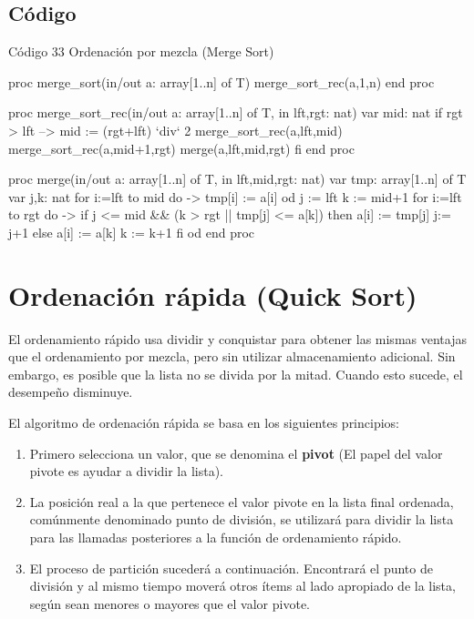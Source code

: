 \subsection{Código}

\begin{codebox}{Código 33}
\footnotesize Ordenación por mezcla (Merge Sort)
\tcblower
\begin{pascallike}
proc merge_sort(in/out a: array[1..n] of T)
    merge_sort_rec(a,1,n)
end proc

proc merge_sort_rec(in/out a: array[1..n] of T, in lft,rgt: nat)
    var mid: nat
    if rgt > lft --> mid := (rgt+lft) `div` 2
        merge_sort_rec(a,lft,mid)
        merge_sort_rec(a,mid+1,rgt)
        merge(a,lft,mid,rgt)
    fi
end proc

proc merge(in/out a: array[1..n] of T, in lft,mid,rgt: nat)
    var tmp: array[1..n] of T
    var j,k: nat
    for i:=lft to mid do ->
        tmp[i] := a[i] 
    od
    j := lft
    k := mid+1
    for i:=lft to rgt do ->
        if j <= mid && (k > rgt || tmp[j] <= a[k])
            then a[i] := tmp[j]
                j:= j+1
            else a[i] := a[k]
                k := k+1
        fi
    od
end proc
\end{pascallike}
\end{codebox}

\section{Ordenación rápida (Quick Sort)}
El ordenamiento rápido usa dividir y conquistar para obtener las mismas ventajas que el ordenamiento por mezcla, pero sin utilizar almacenamiento adicional. Sin embargo, es posible que la lista no se divida por la mitad. Cuando esto sucede, el desempeño disminuye.

El algoritmo de ordenación rápida se basa en los siguientes principios:
\begin{enumerate}
    \item Primero selecciona un valor, que se denomina el \textbf{pivot} (El papel del valor pivote es ayudar a dividir la lista).
    \item La posición real a la que pertenece el valor pivote en la lista final ordenada, comúnmente denominado punto de división, se utilizará para dividir la lista para las llamadas posteriores a la función de ordenamiento rápido.
    \item El proceso de partición sucederá a continuación. Encontrará el punto de división y al mismo tiempo moverá otros ítems al lado apropiado de la lista, según sean menores o mayores que el valor pivote.
\end{enumerate}

